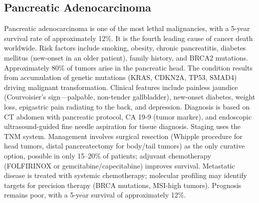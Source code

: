 


\label{sec:Pancreatic Neoplasms}

\subsection{Pancreatic Adenocarcinoma}
\label{sec:Pancreatic Adenocarcinoma}
Pancreatic adenocarcinoma is one of the most lethal malignancies, with a 5-year survival rate of approximately 12\%. It is the fourth leading cause of cancer death worldwide. Risk factors include smoking, obesity, chronic pancreatitis, diabetes mellitus (new-onset in an older patient), family history, and BRCA2 mutations. Approximately 80\% of tumors arise in the pancreatic head. The condition results from accumulation of genetic mutations (KRAS, CDKN2A, TP53, SMAD4) driving malignant transformation. Clinical features include painless jaundice (Courvoisier's sign---palpable, non-tender gallbladder), new-onset diabetes, weight loss, epigastric pain radiating to the back, and depression. Diagnosis is based on CT abdomen with pancreatic protocol, CA 19-9 (tumor marker), and endoscopic ultrasound-guided fine needle aspiration for tissue diagnosis. Staging uses the TNM system. Management involves surgical resection (Whipple procedure for head tumors, distal pancreatectomy for body/tail tumors) as the only curative option, possible in only 15--20\% of patients; adjuvant chemotherapy (FOLFIRINOX or gemcitabine/capecitabine) improves survival. Metastatic disease is treated with systemic chemotherapy; molecular profiling may identify targets for precision therapy (BRCA mutations, MSI-high tumors). Prognosis remains poor, with a 5-year survival of approximately 12\%.

